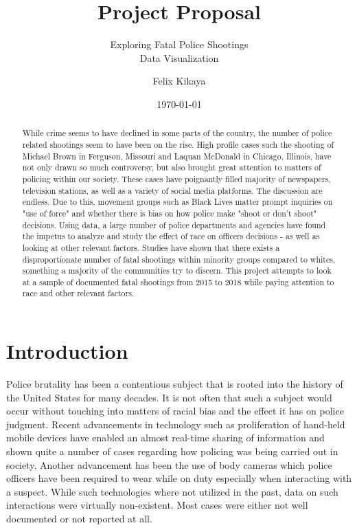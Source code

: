 \documentclass[a4paper,12pt]{scrartcl}
\title{Project Proposal}
\subtitle{Exploring Fatal Police Shootings\\
\large{\small{Data Visualization}}
}
\author{Felix Kikaya}
\date{\today}
\begin{document}
\maketitle

\begin{abstract}
While crime seems to have declined in some parts of the country, the number of police related shootings seem to have been on the rise. High profile cases such the shooting of \cite{ferguson} Michael Brown in Ferguson, Missouri and Laquan McDonald in Chicago, Illinois, have not only drawn so much controversy, but also brought great attention to matters of policing within our society. These cases have poignantly filled majority of newspapers, television stations, as well as a variety of social media platforms. The discussion are endless. Due to this, movement groups such as Black Lives matter prompt inquiries on "use of force" and whether there is bias on how police make "shoot or don't shoot" decisions. Using data, a large number of police departments and agencies have found the impetus to analyze and study the effect of race on officers decisions - as well as looking at other relevant factors. Studies have shown that there exists a disproportionate number of fatal shootings within minority groups compared to whites, something a majority of the communities try to discern. This project attempts to look at a sample of documented fatal shootings from 2015 to 2018 while paying attention to race and other relevant factors. 
\end{abstract}
\section*{Introduction}

Police brutality has been a contentious subject that is rooted into the history of the United States for many decades. It is not often that such a subject would occur without touching into matters of racial bias and the effect it has on police judgment. Recent advancements in technology such as proliferation of hand-held mobile devices have enabled an almost real-time sharing of information and shown quite a number of cases regarding how policing was being carried out in society. Another advancement has been the use of body cameras which police officers have been required to wear while on duty especially when interacting with a suspect. While such technologies where not utilized in the past, data on such interactions were virtually non-existent. Most cases were either not well documented or not reported at all. 
 
\end{document}
